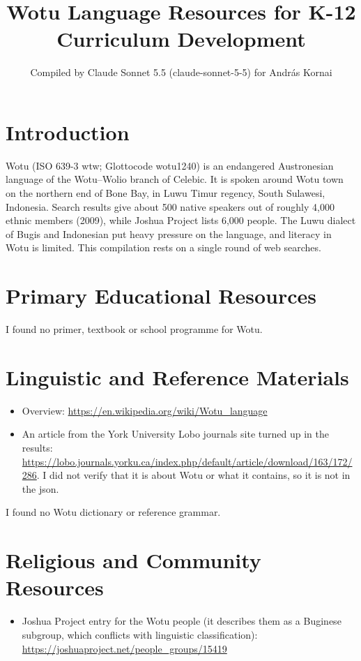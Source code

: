 \documentclass[12pt]{article}
\title{Wotu Language Resources for K-12 Curriculum Development}
\author{Compiled by Claude Sonnet 5.5 (claude-sonnet-5-5) for Andr\'as Kornai}
\date{}
\begin{document}
\maketitle

\section{Introduction}
Wotu (ISO 639-3 wtw; Glottocode wotu1240) is an endangered Austronesian language of the Wotu–Wolio branch of Celebic. It is spoken around Wotu town on the northern end of Bone Bay, in Luwu Timur regency, South Sulawesi, Indonesia. Search results give about 500 native speakers out of roughly 4,000 ethnic members (2009), while Joshua Project lists 6,000 people. The Luwu dialect of Bugis and Indonesian put heavy pressure on the language, and literacy in Wotu is limited. This compilation rests on a single round of web searches.

\section{Primary Educational Resources}
I found no primer, textbook or school programme for Wotu.

\section{Linguistic and Reference Materials}
\begin{itemize}
\item Overview: \url{https://en.wikipedia.org/wiki/Wotu_language}
\item An article from the York University Lobo journals site turned up in the results: \url{https://lobo.journals.yorku.ca/index.php/default/article/download/163/172/286}. I did not verify that it is about Wotu or what it contains, so it is not in the json.
\end{itemize}
I found no Wotu dictionary or reference grammar.

\section{Religious and Community Resources}
\begin{itemize}
\item Joshua Project entry for the Wotu people (it describes them as a Buginese subgroup, which conflicts with linguistic classification): \url{https://joshuaproject.net/people_groups/15419}
\end{itemize}
\end{document}
